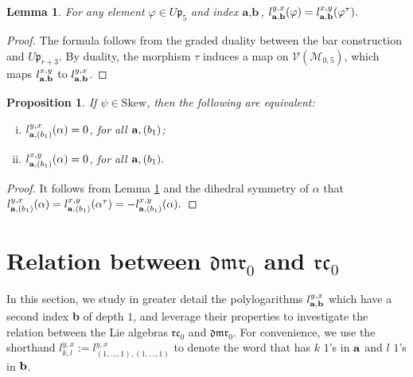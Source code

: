 \documentclass[a4paper,fleqn]{cas-sc}
\newtheorem{lemma}[theorem]{Lemma}
\newtheorem{proposition}[theorem]{Proposition}
\begin{document}
\begin{lemma}\label{lem:dihedral_forms}
	For any element $\varphi\in U\mathfrak{p}_5$ and index $\textbf{a},\textbf{b}$,
$
		l^{y,x}_{\bf{a},\bf{b}}(\varphi)=l^{x,y}_{\bf{a},\bf{b}}(\varphi^{\tau}).
$
\end{lemma}
\begin{proof}
    The formula follows from the graded duality between the bar construction and $U\mathfrak{p}_{r+3}$. By duality, the morphism $\tau$ induces a map on $\mathcal{V}(\mathcal{M}_{0,5})$, which maps $l^{x,y}_{\bold a,\bold b}$ to $l^{y,x}_{\bold a,\bold b}$.  
\end{proof}

\begin{proposition}
If $\psi\in \mathrm{Skew}$, %
then the following are equivalent:
\begin{enumerate}[(i)] %
    \item $l^{y,x}_{\bold a,(b_1)}(\alpha)=0$, \quad for all $\bold a, (b_1)$;
    \item $l^{x,y}_{\bold a,(b_1)}(\alpha)=0$, \quad for all $\bold a, (b_1).$
\end{enumerate}
\end{proposition}

\begin{proof}
It follows from Lemma \ref{lem:dihedral_forms} and the dihedral symmetry of $\alpha$ %
that
$
l^{y,x}_{\bold a,(b_1)}(\alpha)=l^{x,y}_{\bold a, (b_1)}(\alpha^{\tau})=-l^{x,y}_{\bold a,(b_1)}(\alpha).
$
\end{proof}


\section{Relation between $\mathfrak{dmr}_0$ and $\mathfrak{rc}_0$}
\label{sec:linking-dmr-rc}


In this section, we study in greater detail the polylogarithms $l^{y,x}_{\bf{a}, \bf{b}}$ which have a second index \textbf{b} of depth $1$, and leverage their properties 
to investigate the relation between the Lie algebras $\mathfrak{rc}_0$ and $\mathfrak{dmr}_0$. For convenience, we use the shorthand $l^{y,x}_{k,l}:=l^{y,x}_{(1,\dots,1),(1,\dots,1)}$ to denote the word that has $k$ $1$'s in $\bf{a}$ and $l$ $1$'s in $\bf{b}$. 
\end{document}
